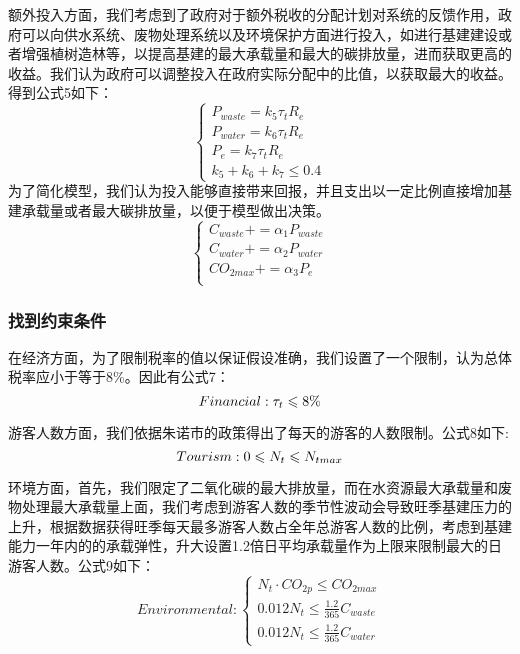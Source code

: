\documentclass[12pt]{article}  %
\begin{document}
额外投入方面，我们考虑到了政府对于额外税收的分配计划对系统的反馈作用，政府可以向供水系统、废物处理系统以及环境保护方面进行投入，如进行基建建设或者增强植树造林等，以提高基建的最大承载量和最大的碳排放量，进而获取更高的收益。我们认为政府可以调整投入在政府实际分配中的比值，以获取最大的收益。得到公式5如下：
\begin{equation}
	\begin{cases}
		P_{waste} = k_5\tau_tR_e\\
		P_{water} = k_6\tau_tR_e\\
		P_{e}=k_7\tau_{t}R_e \\
		k_5+k_6+k_7 \leqslant 0.4
	\end{cases}
\end{equation}
为了简化模型，我们认为投入能够直接带来回报，并且支出以一定比例直接增加基建承载量或者最大碳排放量，以便于模型做出决策。
\begin{equation}
	\begin{cases}
		C_{waste}+=\alpha_1P_{waste} \\
		C_{water}+=\alpha_2P_{water} \\
		CO_{2max}+=\alpha_3P_e \\
	\end{cases}
	\end{equation}
\subsubsection{找到约束条件}
在经济方面，为了限制税率的值以保证假设准确，我们设置了一个限制，认为总体税率应小于等于8\%。因此有公式7：
\begin{equation}
	Financial:\tau_{t}\leqslant 8\% \\
\end{equation}

游客人数方面，我们依据朱诺市的政策\cite{6}得出了每天的游客的人数限制。公式8如下:
\begin{equation}
	Tourism:
		0\leqslant N_{t}\leqslant N_{tmax}\\
\end{equation}

环境方面，首先，我们限定了二氧化碳的最大排放量，而在水资源最大承载量和废物处理最大承载量上面，我们考虑到游客人数的季节性波动会导致旺季基建压力的上升，根据数据获得旺季每天最多游客人数占全年总游客人数的比例，考虑到基建能力一年内的的承载弹性，升大设置1.2倍日平均承载量作为上限来限制最大的日游客人数。公式9如下：
\begin{equation}
	Environmental:
	\begin{cases}
		N_{t}\cdot CO_{2p}\leqslant CO_{2max} \\
		0.012N_t\leqslant \frac{1.2}{365}C_{waste} \\
		0.012N_t\leqslant \frac{1.2}{365}C_{water}
	\end{cases}
\end{equation}
\end{document}
